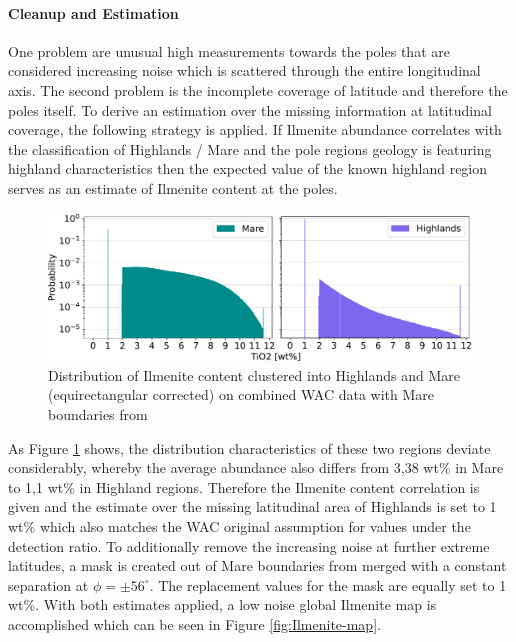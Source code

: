 \documentclass[utf8]{FrontiersinHarvard} %
\begin{document}
\newpage
\paragraph{Cleanup and Estimation}
One problem are unusual high measurements towards the poles that are considered increasing noise which is scattered through the entire longitudinal axis.
The second problem is the incomplete coverage of latitude and therefore the poles itself.
To derive an estimation over the missing information at latitudinal coverage, the following strategy is applied.
If Ilmenite abundance correlates with the classification of Highlands / Mare and the pole regions geology is featuring highland characteristics then the expected value of the known highland region serves as an estimate of Ilmenite content at the poles.


\begin{figure}[h!]
\begin{center}
\includegraphics[width=\linewidth]{img/WAC_TIO2_CLUSTERING.pdf}
\end{center}
\caption{Distribution of Ilmenite content clustered into Highlands and Mare (equirectangular corrected) on combined WAC data with Mare boundaries from \citep{Nelson.2014}}
\label{fig:TiO2-Highlands-Mare-Distribution}
\end{figure}


As Figure \ref{fig:TiO2-Highlands-Mare-Distribution} shows, the distribution characteristics of these two regions deviate considerably, whereby the average abundance also differs from 3,38 wt\% in Mare to 1,1 wt\% in Highland regions. Therefore the Ilmenite content correlation is given and the estimate over the missing latitudinal area of Highlands is set to 1 wt\% which also matches the WAC original assumption for values under the detection ratio.
To additionally remove the increasing noise at further extreme latitudes, a mask is created out of  Mare boundaries from \citep{Nelson.2014} merged with a constant separation at $\phi = \pm56 ^{\circ}$. The replacement values for the mask are equally set to 1 wt\%.
With both estimates applied, a low noise global Ilmenite map is accomplished which can be seen in Figure \ref{fig:Ilmenite-map}.
\end{document}

